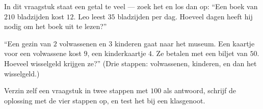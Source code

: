 \begin{exercise}[$\star$]\label{exo:g3:problems:9}
In dit vraagstuk staat een getal te veel --- zoek het en los dan op: ``Een
boek van $210$ bladzijden kost $12$. Leo leest $35$ bladzijden per dag.
Hoeveel dagen heeft hij nodig om het boek uit te lezen?''
\end{exercise}

\begin{exercise}[$\star\star$]\label{exo:g3:problems:10}
``Een gezin van $2$ volwassenen en $3$ kinderen gaat naar het museum. Een
kaartje voor een volwassene kost $9$, een kinderkaartje $4$. Ze betalen
met een biljet van $50$. Hoeveel wisselgeld krijgen ze?'' (Drie stappen:
volwassenen, kinderen, en dan het wisselgeld.)
\end{exercise}

\begin{exercise}[$\star\star$]\label{exo:g3:problems:11}
Verzin zelf een vraagstuk in twee stappen met $100$ als antwoord, schrijf
de oplossing met de vier stappen op, en test het bij een klasgenoot.
\end{exercise}
